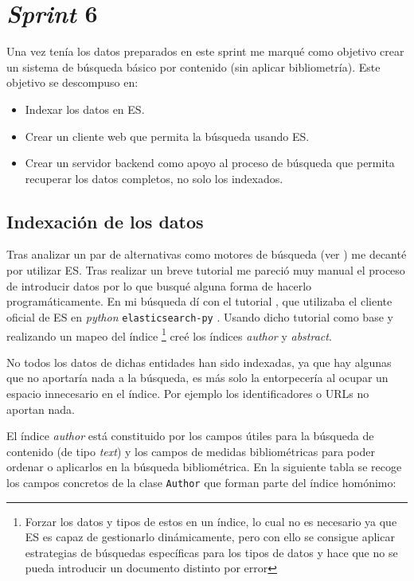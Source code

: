 \section{\textit{Sprint} 6}
Una vez tenía los datos preparados en este sprint me marqué como objetivo crear un sistema de búsqueda básico por contenido (sin aplicar bibliometría). Este objetivo se descompuso en:
\begin{itemize}
	\item Indexar los datos en \acrlong{ES}.
	\item Crear un cliente web que permita la búsqueda usando \acrshort{ES}.
	\item Crear un servidor \gls{backend} como apoyo al proceso de búsqueda que permita recuperar los datos completos, no solo los indexados.
\end{itemize}

\subsection{Indexación de los datos}
Tras analizar un par de alternativas como motores de búsqueda (ver ) me decanté por utilizar \acrshort{ES}. Tras realizar un breve tutorial me pareció muy manual el proceso de introducir datos por lo que busqué alguna forma de hacerlo programáticamente. En mi búsqueda dí con el tutorial \cite{indexingES}, que utilizaba el cliente oficial de \acrshort{ES} en \textit{python} \texttt{elasticsearch-py} \cite{ES_client}. Usando dicho tutorial como base y realizando un mapeo del índice \footnote{Forzar los datos y tipos de estos en un índice, lo cual no es necesario ya que \acrshort{ES} es capaz de gestionarlo dinámicamente, pero con ello se consigue aplicar estrategias de búsquedas específicas para los tipos de datos y hace que no se pueda introducir un documento distinto por error}\cite{mappingES} creé los índices \textit{author} y \textit{abstract}.

No todos los datos de dichas entidades han sido indexadas, ya que hay algunas que no aportaría nada a la búsqueda, es más solo la entorpecería al ocupar un espacio innecesario en el índice. Por ejemplo los identificadores o \acrshort{URL}s no aportan nada.

El índice \textit{author} está constituido por los campos útiles para la búsqueda de contenido (de tipo \textit{text}) y los campos de medidas bibliométricas para poder ordenar o aplicarlos en la búsqueda bibliométrica. En la siguiente tabla se recoge los campos concretos de la clase \texttt{Author} que forman parte del índice homónimo:

